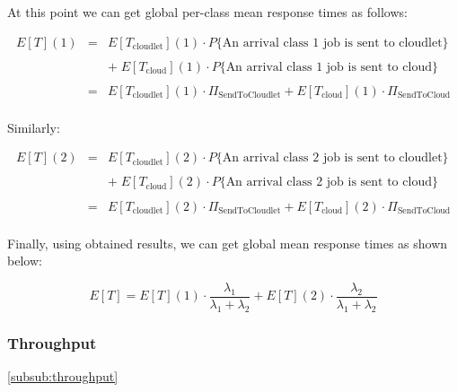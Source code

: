 \documentclass[10pt,a4paper]{article}
\begin{document}
At this point we can get global per-class mean response times as follows:

\begin{equation}
\begin{array} {lcl} 
E[T](1) & = & E[T_{\text{cloudlet}}](1)\cdot P\lbrace\text{An arrival class 1 job is sent to cloudlet}\rbrace \\
\\
& & +\; E[T_{\text{cloud}}](1)\cdot P\lbrace\text{An arrival class 1 job is sent to cloud}\rbrace \\
\\
& = & E[T_{\text{cloudlet}}](1)\cdot \Pi_{\text{SendToCloudlet}} + E[T_{\text{cloud}}](1)\cdot \Pi_{\text{SendToCloud}} \\

\end{array}
\end{equation}

Similarly:

\begin{equation}
\begin{array} {lcl} 
E[T](2) & = & E[T_{\text{cloudlet}}](2)\cdot P\lbrace\text{An arrival class 2 job is sent to cloudlet}\rbrace \\
\\
& & +\; E[T_{\text{cloud}}](2)\cdot P\lbrace\text{An arrival class 2 job is sent to cloud}\rbrace \\
\\
& = & E[T_{\text{cloudlet}}](2)\cdot \Pi_{\text{SendToCloudlet}} + E[T_{\text{cloud}}](2)\cdot \Pi_{\text{SendToCloud}} \\

\end{array}
\end{equation}

Finally, using obtained results, we can get global mean response times as shown below:

\begin{equation}
E[T] = E[T](1) \cdot \dfrac{\lambda_1}{\lambda_1 + \lambda_2} + E[T](2) \cdot \dfrac{\lambda_2}{\lambda_1 + \lambda_2}
\end{equation}

\subsubsection{Throughput}\ref{subsub:throughput}
\end{document}
